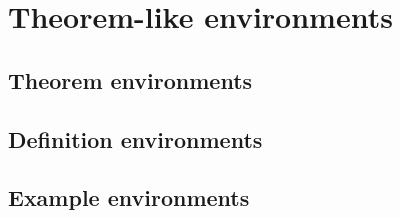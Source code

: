 \documentclass[xetex]{beamer}
\newcounter{ct}
\begin{document}
	\section{Theorem-like environments}
	\subsection{Theorem environments}
	\subsection{Definition environments}
	
	\subsection{Example environments}
		
\end{document}
